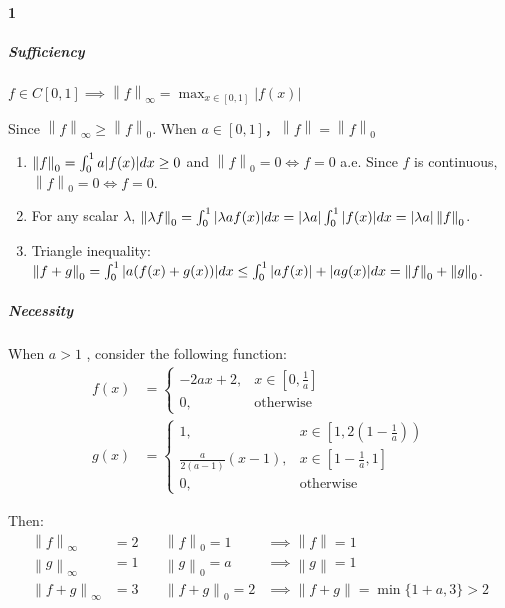\documentclass{ctexart}
\begin{document}
\paragraph{1}
\subparagraph{Sufficiency}
\(f \in C[0,1] \implies \left\| f \right\|_{\infty } = \max_{x \in
[0,1]} |f(x)|\)

Since \(\left\| f \right\|_{\infty} \geq \left\| f \right\|_{0}\). When
\(a \in [0,1]\)，\(\left\| f \right\| = \left\| f \right\|_{0}\)

\begin{enumerate}
    \item \(\left\| f \right\|_{0} = \int_{0}^{1} a\abs{f(x)} dx
        \geq 0\) and \(\left\| f \right\|_{0} = 0 \iff f = 0\) a.e.
        Since \(f\) is continuous, \(\left\| f \right\|_{0} = 0 \iff f = 0\).
    \item For any scalar \(\lambda\), \(\left\| \lambda f \right\|_{0} =
            \int_{0}^{1} \abs{\lambda a f(x)} dx = \abs{\lambda a}
            \int_{0}^{1} \abs{f(x)} dx = \abs{\lambda a} \left\| f
        \right\|_{0}\).
    \item Triangle inequality: \(\left\| f + g \right\|_{0} =
            \int_{0}^{1} \abs{a(f(x) + g(x))} dx \leq
            \int_{0}^{1} \abs{af(x)} + \abs{ag(x)} dx = \left\| f
        \right\|_{0} + \left\| g \right\|_{0}\).

\end{enumerate}

\subparagraph{Necessity}

When \(a > 1\) , consider the following function:
\begin{align*}
    f(x) &=
    \begin{cases}
        -2ax + 2, & x \in \left[ 0, \frac{1}{a} \right] \\
        0, & \text{otherwise}
    \end{cases} \\
    g(x) &=
    \begin{cases}
        1, & x \in \left[1, 2\left( 1-\frac{1}{a} \right)\right) \\
        \frac{a}{2(a-1)}(x-1), & x \in \left[ 1-\frac{1}{a}, 1 \right] \\
        0, & \text{otherwise}
    \end{cases}
\end{align*}

Then:
\begin{align*}
    \left\| f \right\|_{\infty} &= 2 &\quad \left\| f \right\|_{0} =
    1 &\implies \left\| f \right\| = 1\\
    \left\| g \right\|_{\infty} &= 1 &\quad \left\| g \right\|_{0} =
    a &\implies \left\| g \right\| = 1\\
    \left\| f + g \right\|_{\infty} &= 3 &\quad \left\| f + g
    \right\|_{0} = 2 &\implies \left\| f + g \right\| = \min \{1+a,3\} > 2
\end{align*}
\end{document}
